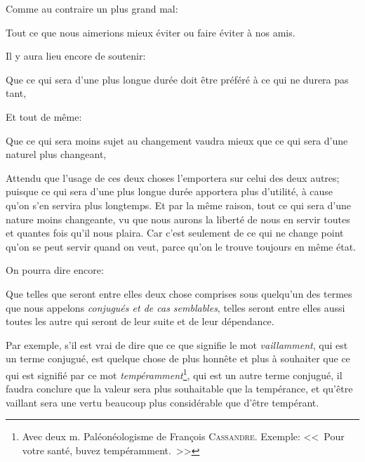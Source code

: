 Comme au contraire un plus grand mal:

\begin{lieu}
	Tout ce que nous aimerions mieux éviter ou faire éviter à nos amis.
\end{lieu}

\bigbreak

Il y aura lieu encore de soutenir:

\begin{lieu}
	Que ce qui sera d'une plus longue durée doit être préféré à ce qui ne durera pas tant,
\end{lieu}

Et tout de même:

\begin{lieu}
	Que ce qui sera moins sujet au changement vaudra mieux que ce qui sera d'une naturel plus changeant,
\end{lieu}

Attendu que l'usage de ces deux choses l'emportera sur celui des deux autres; puisque ce qui sera d'une plus
longue durée apportera plus d'utilité, à cause qu'on s'en servira plus longtemps. Et par la même raison, tout
ce qui sera d'une nature moins changeante, vu que nous aurons la liberté de nous en servir toutes et quantes
fois qu'il nous plaira. Car c'est seulement de ce qui ne change point qu'on se peut servir quand on veut, parce
qu'on le trouve toujours en même état.

\bigbreak

On pourra dire encore:

\begin{lieu}
	Que telles que seront entre elles deux chose comprises sous quelqu'un des termes que nous appelons \emph{
	conjugués et de cas semblables}, telles seront entre elles aussi toutes les autre qui seront de leur suite
	et de leur dépendance.
\end{lieu}

Par exemple, s'il est vrai de dire que ce que signifie le mot \emph{vaillamment}, qui est un terme conjugué, est
quelque chose de plus honnête et plus à souhaiter que ce qui est signifié par ce mot \emph{tempéramment}\footnote{
Avec deux m. Paléonéologisme de François \textsc{Cassandre}. Exemple: <<~Pour votre santé, buvez tempéramment.~>>},
qui est un autre terme conjugué, il faudra conclure que la valeur sera plus souhaitable que la tempérance, et qu'être
vaillant sera une vertu beaucoup plus considérable que d'être tempérant.

\bigbreak

